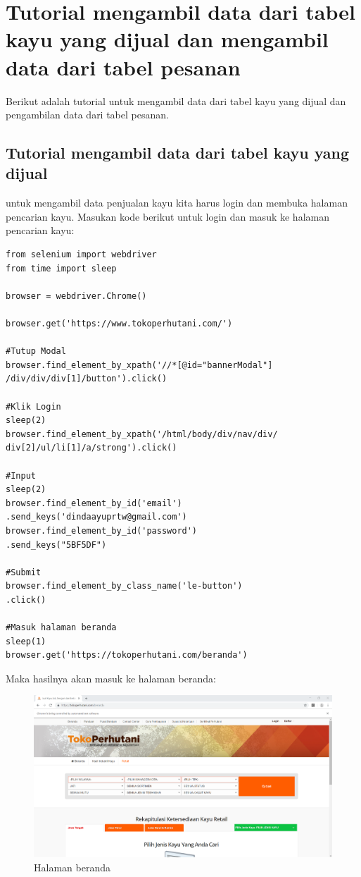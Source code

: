 \newpage
\section{Tutorial mengambil data dari tabel kayu yang dijual dan mengambil data dari tabel pesanan}
Berikut adalah tutorial untuk  mengambil data dari tabel kayu yang dijual dan pengambilan data dari tabel pesanan. 

\subsection{Tutorial mengambil data dari tabel kayu yang dijual}
untuk mengambil data penjualan kayu kita harus login dan membuka halaman pencarian kayu.
Masukan kode berikut untuk login dan masuk ke halaman pencarian kayu:
\begin{verbatim}
from selenium import webdriver
from time import sleep

browser = webdriver.Chrome()

browser.get('https://www.tokoperhutani.com/')

#Tutup Modal
browser.find_element_by_xpath('//*[@id="bannerModal"]
/div/div/div[1]/button').click()

#Klik Login
sleep(2)
browser.find_element_by_xpath('/html/body/div/nav/div/
div[2]/ul/li[1]/a/strong').click()

#Input 
sleep(2)
browser.find_element_by_id('email')
.send_keys('dindaayuprtw@gmail.com')
browser.find_element_by_id('password')
.send_keys("5BF5DF")

#Submit
browser.find_element_by_class_name('le-button')
.click()

#Masuk halaman beranda
sleep(1)
browser.get('https://tokoperhutani.com/beranda')
\end{verbatim}
\newpage
Maka hasilnya akan masuk ke halaman beranda:
\begin{figure}[h]
	\centering
	\includegraphics[scale=0.30]{figures/7beranda}
	\caption{Halaman beranda}
\end{figure}

